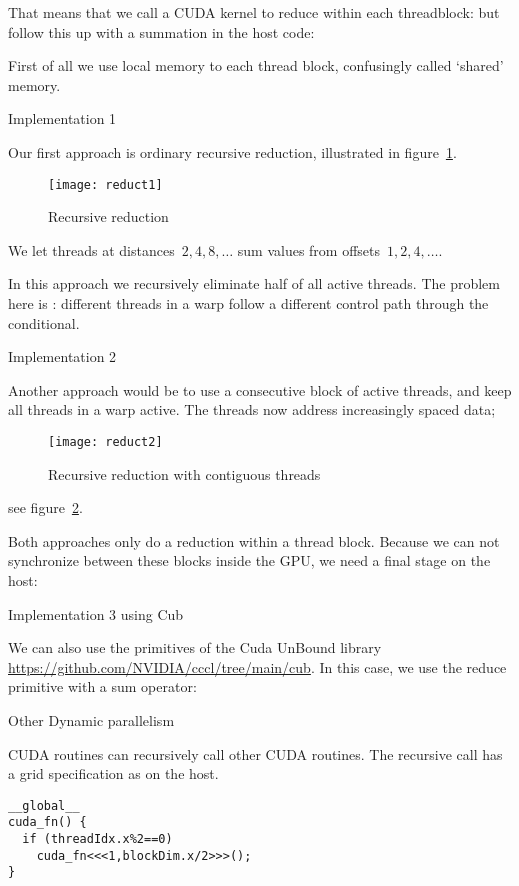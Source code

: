 That means that we call a \ac{CUDA} kernel to reduce
within each threadblock:
but follow this up with a summation in the host code:

First of all we use local memory to each thread block,
confusingly called `shared' memory.

 {Implementation 1}

Our first approach is ordinary recursive reduction,
illustrated in figure~\ref{fig:cureduct1}.
\begin{figure}[ht]
  \texttt{[image: reduct1]}
  \caption{Recursive reduction}
  \label{fig:cureduct1}
\end{figure}
We let threads
at distances~$2,4,8,\ldots$ sum values
from offsets~$1,2,4,\ldots$.

In this approach we recursively eliminate half of all active threads.
The problem here is :
different threads in a warp follow a different control path
through the conditional.

 {Implementation 2}

Another approach would be to use a consecutive block of active threads,
and keep all threads in a warp active.
The threads now
address increasingly spaced data;
\begin{figure}[ht]
  \texttt{[image: reduct2]}
  \caption{Recursive reduction with contiguous threads}
  \label{fig:cureduct2}
\end{figure}
see figure~\ref{fig:cureduct2}.

Both approaches only do a reduction within a thread block.
Because we can not synchronize between these blocks inside the GPU,
we need a final stage on the host:

 {Implementation 3 using Cub}

We can also use the primitives of the Cuda UnBound library
\url{https://github.com/NVIDIA/cccl/tree/main/cub}.
In this case, we use the reduce primitive
with a sum operator:

 {Other}
 {Dynamic parallelism}

\ac{CUDA} routines can recursively call other
\ac{CUDA} routines.
The recursive call has a grid specification
as on the host.
\begin{lstlisting}
__global__
cuda_fn() {
  if (threadIdx.x%2==0)
    cuda_fn<<<1,blockDim.x/2>>>();
}
\end{lstlisting}

